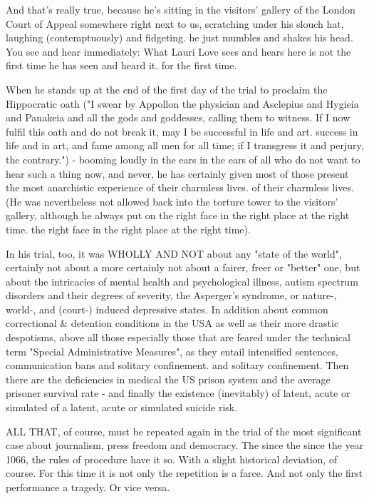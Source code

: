 \begin{multicols}{2}
And that's really true, because he's sitting in the visitors' gallery of the London Court of Appeal somewhere
right next to us, scratching under his slouch hat,
laughing (contemptuously) and fidgeting.
he just mumbles and shakes his head. You see and hear immediately:
What Lauri Love sees and hears here is not the first time he has seen and heard it.
for the first time.

When he stands up at the end of the first day of the trial to proclaim the Hippocratic oath
("I swear by Appollon the physician and Asclepius and
Hygieia and Panakeia and all the gods and goddesses,
calling them to witness. If I now fulfil this oath
and do not break it, may I be successful in life and art.
success in life and in art, and fame among all men for all time; if I transgress it and
perjury, the contrary.") - booming loudly in the ears
in the ears of all who do not want to hear such a thing now, and never, he has certainly given most of those present
the most anarchistic experience of their charmless lives.
of their charmless lives. (He was nevertheless not allowed back into the torture tower to the visitors' gallery, although
he always put on the right face in the right place at the right time.
the right face in the right place at the right time).

In his trial, too, it was WHOLLY AND
NOT about any "state of the world", certainly not about a more
certainly not about a fairer, freer or "better" one, but about the intricacies of mental health and psychological illness, autism spectrum disorders and their degrees of severity, the
Asperger's syndrome, or nature-, world-, and (court-) induced depressive states. In addition
about common correctional \& detention conditions
in the USA as well as their more drastic despotisms, above all those
especially those that are feared under the technical term "Special Administrative Measures", as they entail intensified sentences, communication bans and solitary confinement.
and solitary confinement. Then there are the deficiencies in medical
the US prison system and the average prisoner survival rate - and finally
the existence (inevitably) of latent, acute or simulated
of a latent, acute or simulated suicide risk.

ALL THAT, of course, must be repeated again in the trial of the most significant case about journalism, press freedom and democracy. The since the
since the year 1066, the rules of procedure have
it so. With a slight historical deviation, of course. For this time it is not only the repetition
is a farce. And not only the first performance a tragedy. Or vice versa.


\end{multicols}
